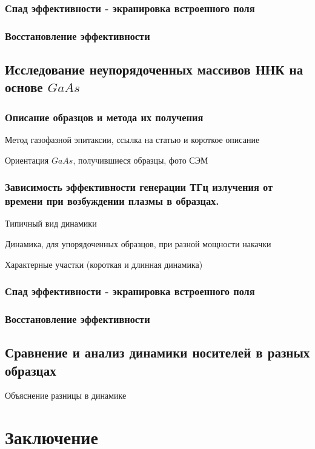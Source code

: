 \documentclass[a4paper,14pt,russian]{extreport}
\begin{document}
			\subsection{Спад эффективности - экранировка встроенного поля}
			\subsection{Восстановление эффективности}
		\section{Исследование неупорядоченных массивов ННК на основе $GaAs$}
			\subsection{Описание образцов и метода их получения}
				Метод газофазной эпитаксии, ссылка на
				статью и короткое описание\par
				Ориентация $GaAs$, получившиеся образцы,
				фото СЭМ
			\newpage
			\subsection{Зависимость эффективности генерации ТГц излучения от времени при возбуждении плазмы в образцах.}
				Типичный вид динамики\par
				Динамика, для упорядоченных образцов,
				при разной мощности накачки\par
				Характерные участки (короткая и длинная
				динамика)\par
			\subsection{Спад эффективности - экранировка встроенного поля}
			\subsection{Восстановление эффективности}
		\section{Сравнение и анализ динамики носителей в разных образцах}
			Объяснение разницы в динамике
			\newpage
	\chapter{Заключение}
\end{document}

